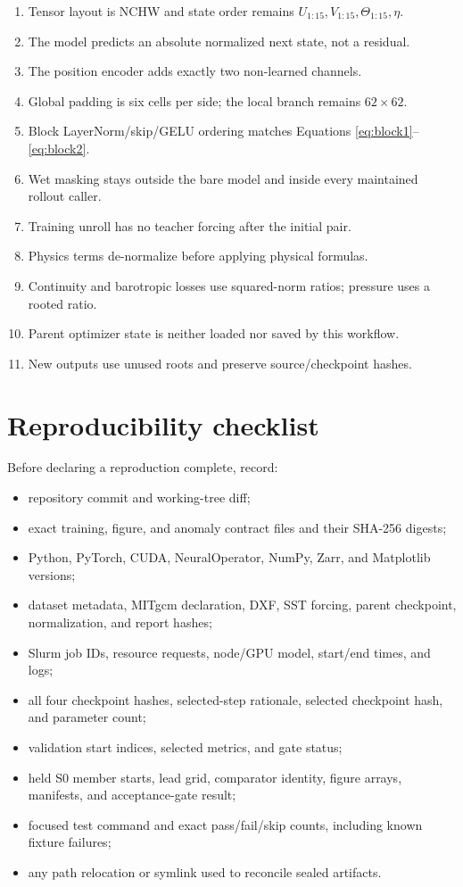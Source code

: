 \documentclass[11pt,oneside]{report}
\begin{document}
\begin{enumerate}
  \item Tensor layout is NCHW and state order remains
        \(U_{1:15},V_{1:15},\Theta_{1:15},\eta\).
  \item The model predicts an absolute normalized next state, not a residual.
  \item The position encoder adds exactly two non-learned channels.
  \item Global padding is six cells per side; the local branch remains
        \(62\times62\).
  \item Block LayerNorm/skip/GELU ordering matches Equations
        \eqref{eq:block1}--\eqref{eq:block2}.
  \item Wet masking stays outside the bare model and inside every maintained
        rollout caller.
  \item Training unroll has no teacher forcing after the initial pair.
  \item Physics terms de-normalize before applying physical formulas.
  \item Continuity and barotropic losses use squared-norm ratios; pressure uses
        a rooted ratio.
  \item Parent optimizer state is neither loaded nor saved by this workflow.
  \item New outputs use unused roots and preserve source/checkpoint hashes.
\end{enumerate}

\chapter{Reproducibility checklist}
\label{ch:checklist}

Before declaring a reproduction complete, record:

\begin{itemize}
  \item repository commit and working-tree diff;
  \item exact training, figure, and anomaly contract files and their SHA-256
        digests;
  \item Python, PyTorch, CUDA, NeuralOperator, NumPy, Zarr, and Matplotlib
        versions;
  \item dataset metadata, MITgcm declaration, DXF, SST forcing, parent
        checkpoint, normalization, and report hashes;
  \item Slurm job IDs, resource requests, node/GPU model, start/end times, and
        logs;
  \item all four checkpoint hashes, selected-step rationale, selected
        checkpoint hash, and parameter count;
  \item validation start indices, selected metrics, and gate status;
  \item held S0 member starts, lead grid, comparator identity, figure arrays,
        manifests, and acceptance-gate result;
  \item focused test command and exact pass/fail/skip counts, including known
        fixture failures;
  \item any path relocation or symlink used to reconcile sealed artifacts.
\end{itemize}
\end{document}
